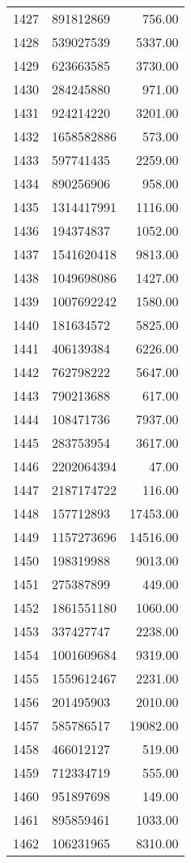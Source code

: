\begin{table}[ht]
\begin{tabular}{rlr}
  1427 & 891812869 & 756.00 \\ 
  1428 & 539027539 & 5337.00 \\ 
  1429 & 623663585 & 3730.00 \\ 
  1430 & 284245880 & 971.00 \\ 
  1431 & 924214220 & 3201.00 \\ 
  1432 & 1658582886 & 573.00 \\ 
  1433 & 597741435 & 2259.00 \\ 
  1434 & 890256906 & 958.00 \\ 
  1435 & 1314417991 & 1116.00 \\ 
  1436 & 194374837 & 1052.00 \\ 
  1437 & 1541620418 & 9813.00 \\ 
  1438 & 1049698086 & 1427.00 \\ 
  1439 & 1007692242 & 1580.00 \\ 
  1440 & 181634572 & 5825.00 \\ 
  1441 & 406139384 & 6226.00 \\ 
  1442 & 762798222 & 5647.00 \\ 
  1443 & 790213688 & 617.00 \\ 
  1444 & 108471736 & 7937.00 \\ 
  1445 & 283753954 & 3617.00 \\ 
  1446 & 2202064394 & 47.00 \\ 
  1447 & 2187174722 & 116.00 \\ 
  1448 & 157712893 & 17453.00 \\ 
  1449 & 1157273696 & 14516.00 \\ 
  1450 & 198319988 & 9013.00 \\ 
  1451 & 275387899 & 449.00 \\ 
  1452 & 1861551180 & 1060.00 \\ 
  1453 & 337427747 & 2238.00 \\ 
  1454 & 1001609684 & 9319.00 \\ 
  1455 & 1559612467 & 2231.00 \\ 
  1456 & 201495903 & 2010.00 \\ 
  1457 & 585786517 & 19082.00 \\ 
  1458 & 466012127 & 519.00 \\ 
  1459 & 712334719 & 555.00 \\ 
  1460 & 951897698 & 149.00 \\ 
  1461 & 895859461 & 1033.00 \\ 
  1462 & 106231965 & 8310.00 \\ 

\end{tabular}
\end{table}
